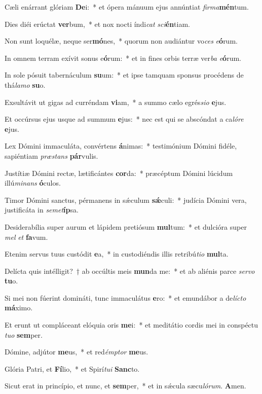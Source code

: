 \item Cæli enárrant glóriam \textbf{De}i:~* et ópera mánuum ejus annúntiat \textit{fir}\textit{ma}\textbf{mén}tum.
\item Dies diéi erúctat \textbf{ver}bum,~* et nox nocti índi\textit{cat} \textit{sci}\textbf{én}tiam.
\item Non sunt loquélæ, neque ser\textbf{mó}nes,~* quorum non audiántur vo\textit{ces} \textit{e}\textbf{ó}rum.
\item In omnem terram exívit sonus e\textbf{ó}rum:~* et in fines orbis terræ ver\textit{ba} \textit{e}\textbf{ó}rum.
\item In sole pósuit tabernáculum \textbf{su}um:~* et ipse tamquam sponsus procédens de thá\textit{la}\textit{mo} \textbf{su}o.
\item Exsultávit ut gigas ad curréndam \textbf{vi}am,~* a summo cælo egrés\textit{si}\textit{o} \textbf{e}jus.
\item Et occúrsus ejus usque ad summum \textbf{e}jus:~* nec est qui se abscóndat a ca\textit{ló}\textit{re} \textbf{e}jus.
\item Lex Dómini immaculáta, convértens \textbf{á}nimas:~* testimónium Dómini fidéle, sapiéntiam \textit{præ}\textit{stans} \textbf{pár}vulis.
\item Justítiæ Dómini rectæ, lætificántes \textbf{cor}da:~* præcéptum Dómini lúcidum illú\textit{mi}\textit{nans} \textbf{ó}culos.
\item Timor Dómini sanctus, pérmanens in sǽculum \textbf{sǽ}culi:~* judícia Dómini vera, justificáta in \textit{se}\textit{met}\textbf{íp}sa.
\item Desiderabília super aurum et lápidem pretiósum \textbf{mul}tum:~* et dulcióra super \textit{mel} \textit{et} \textbf{fa}vum.
\item Etenim servus tuus custódit \textbf{e}a,~* in custodiéndis illis retribú\textit{ti}\textit{o} \textbf{mul}ta.
\item Delícta quis intélligit?~† ab occúltis meis \textbf{mun}da me:~* et ab aliénis parce \textit{ser}\textit{vo} \textbf{tu}o.
\item Si mei non fúerint domináti, tunc immaculátus \textbf{e}ro:~* et emundábor a de\textit{líc}\textit{to} \textbf{má}ximo.
\item Et erunt ut compláceant elóquia oris \textbf{me}i:~* et meditátio cordis mei in conspéctu \textit{tu}\textit{o} \textbf{sem}per.
\item Dómine, adjútor \textbf{me}us,~* et red\textit{émp}\textit{tor} \textbf{me}us.
\item Glória Patri, et \textbf{Fí}lio,~* et Spirí\textit{tu}\textit{i} \textbf{Sanc}to.
\item Sicut erat in princípio, et nunc, et \textbf{sem}per,~* et in sǽcula sæcu\textit{ló}\textit{rum}. \textbf{A}men.
